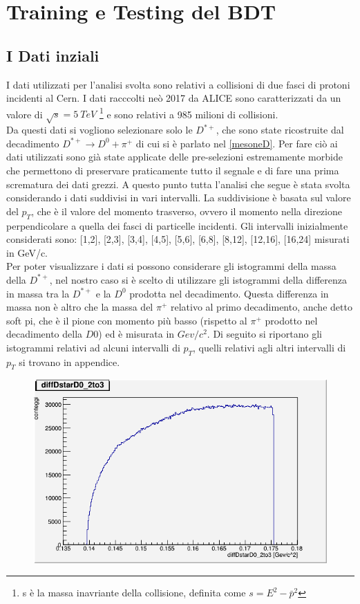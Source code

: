 \chapter{Training e Testing del BDT}

\section{I Dati inziali}

I dati utilizzati per l'analisi svolta sono relativi a collisioni di due fasci di protoni incidenti al Cern. I dati racccolti neò 2017 da ALICE sono caratterizzati da un valore di $\sqrt{s} = 5 \ TeV$ \footnote{s è la massa inavriante della collisione, definita come $s = E^2 - \bar p ^2$} e sono relativi a 985 milioni di collisioni.
\\Da questi dati si vogliono selezionare solo le $D^{*+}$, che sono state ricostruite dal decadimento $D^{*+} \rightarrow D^0 + \pi^+ $ di cui si è parlato nel \ref{mesoneD}. Per fare ciò ai dati utilizzati sono già state applicate delle pre-selezioni estremamente morbide che permettono di preservare praticamente tutto il segnale e di fare una prima scrematura dei dati grezzi.
A questo punto tutta l'analisi che segue è stata svolta considerando i dati suddivisi in vari intervalli. La suddivisione è basata sul valore del $p_T$, che è il valore del momento trasverso, ovvero il momento nella direzione perpendicolare a quella dei fasci di particelle incidenti. Gli intervalli inizialmente considerati sono: [1,2], [2,3], [3,4], [4,5], [5,6], [6,8], [8,12], [12,16], [16,24] misurati in GeV/c. 
\\Per poter visualizzare i dati si possono considerare gli istogrammi della massa della $D^{*+}$, nel nostro caso si è scelto di utilizzare gli istogrammi della differenza in massa tra la $D^{*+}$ e la $D^0$ prodotta nel decadimento. Questa differenza in massa non è altro che la massa del $\pi^+$ relativo al primo decadimento, anche detto soft pi, che è il pione con momento più basso (rispetto al $\pi^+$ prodotto nel decadimento della $D0$) ed è misurata in $Gev/c^2$. %
Di seguito si riportano gli istogrammi relativi ad alcuni intervalli di $p_T$, quelli relativi agli altri intervalli di $p_T$ si trovano in appendice. 

    \begin{figure}[htbp]
        \centering
        \includegraphics[width=0.7\linewidth]{training&testing/diffDstarD0_2to3.png}
        \caption{}
        \label{fig:grafmassDstar1}
    \end{figure}
    
